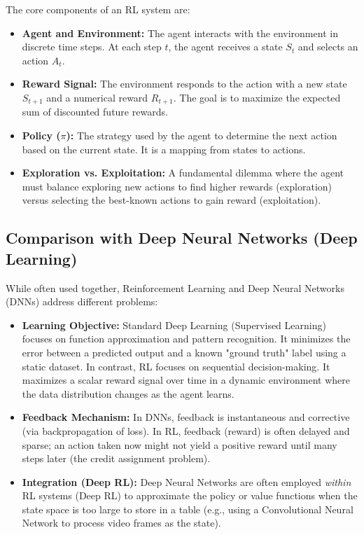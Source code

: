 \documentclass[a4paper,12pt]{article}
\begin{document}
The core components of an RL system are:
\begin{itemize}
    \item \textbf{Agent and Environment:} The agent interacts with the environment in discrete time steps. At each step $t$, the agent receives a state $S_t$ and selects an action $A_t$.
    \item \textbf{Reward Signal:} The environment responds to the action with a new state $S_{t+1}$ and a numerical reward $R_{t+1}$. The goal is to maximize the expected sum of discounted future rewards.
    \item \textbf{Policy ($\pi$):} The strategy used by the agent to determine the next action based on the current state. It is a mapping from states to actions.
    \item \textbf{Exploration vs. Exploitation:} A fundamental dilemma where the agent must balance exploring new actions to find higher rewards (exploration) versus selecting the best-known actions to gain reward (exploitation).
\end{itemize}

\subsection*{Comparison with Deep Neural Networks (Deep Learning)}
While often used together, Reinforcement Learning and Deep Neural Networks (DNNs) address different problems:
\begin{itemize}
    \item \textbf{Learning Objective:} Standard Deep Learning (Supervised Learning) focuses on function approximation and pattern recognition. It minimizes the error between a predicted output and a known "ground truth" label using a static dataset. In contrast, RL focuses on sequential decision-making. It maximizes a scalar reward signal over time in a dynamic environment where the data distribution changes as the agent learns.
    \item \textbf{Feedback Mechanism:} In DNNs, feedback is instantaneous and corrective (via backpropagation of loss). In RL, feedback (reward) is often delayed and sparse; an action taken now might not yield a positive reward until many steps later (the credit assignment problem).
    \item \textbf{Integration (Deep RL):} Deep Neural Networks are often employed \textit{within} RL systems (Deep RL) to approximate the policy or value functions when the state space is too large to store in a table (e.g., using a Convolutional Neural Network to process video frames as the state).
\end{itemize}
\end{document}

